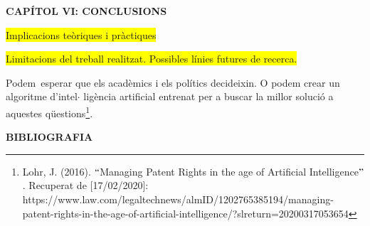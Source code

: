 \documentclass[12pt]{article}
\begin{document}
\vspace{\baselineskip}

\vspace{\baselineskip}

\vspace{\baselineskip}

\vspace{\baselineskip}

\vspace{\baselineskip}
\begin{Center}
{\fontsize{16pt}{19.2pt}\selectfont \textbf{CAPÍTOL VI: CONCLUSIONS}\par}
\end{Center}\par


\vspace{\baselineskip}

\vspace{\baselineskip}

\vspace{\baselineskip}
\begin{justify}
\colorbox{Yellow}{Implicacions teòriques i pràctiques}
\end{justify}\par

\begin{justify}
\colorbox{Yellow}{Limitacions del treball realitzat. Possibles línies futures de recerca.} 
\end{justify}\par


\vspace{\baselineskip}
\begin{justify}
Podem\ esperar  que els acadèmics i els polítics decideixin. O podem crear un algoritme d’intel$ \cdot $ ligència artificial entrenat per a buscar la millor solució a aquestes qüestions\footnote{ Lohr, J. (2016). $``$Managing Patent Rights in the age of Artificial Intelligence$"$ . Recuperat de [17/02/2020]: https://www.law.com/legaltechnews/almID/1202765385194/managing-patent-rights-in-the-age-of-artificial-intelligence/?slreturn=20200317053654 }. 
\end{justify}\par


\vspace{\baselineskip}
\begin{Center}
{\fontsize{16pt}{19.2pt}\selectfont \textbf{BIBLIOGRAFIA}\par}
\end{Center}\par
\end{document}
